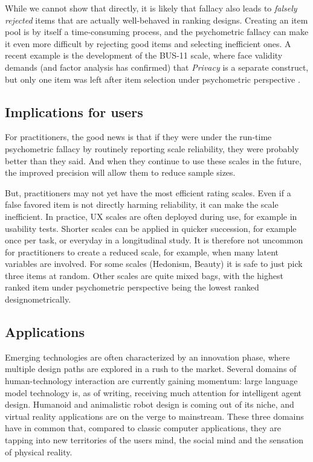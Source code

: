 \documentclass[
  authoryear,
  review]{elsarticle}
\begin{document}
While we cannot show that directly, it is likely that fallacy also leads
to \emph{falsely rejected} items that are actually well-behaved in
ranking designs. Creating an item pool is by itself a time-consuming
process, and the psychometric fallacy can make it even more difficult by
rejecting good items and selecting inefficient ones. A recent example is
the development of the BUS-11 scale, where face validity demands (and
factor analysis has confirmed) that \emph{Privacy} is a separate
construct, but only one item was left after item selection under
psychometric perspective \citep{Borsci2022}.

\subsection{Implications for users}\label{implications-for-users}

For practitioners, the good news is that if they were under the run-time
psychometric fallacy by routinely reporting scale reliability, they were
probably better than they said. And when they continue to use these
scales in the future, the improved precision will allow them to reduce
sample sizes.

But, practitioners may not yet have the most efficient rating scales.
Even if a false favored item is not directly harming reliability, it can
make the scale inefficient. In practice, UX scales are often deployed
during use, for example in usability tests. Shorter scales can be
applied in quicker succession, for example once per task, or everyday in
a longitudinal study. It is therefore not uncommon for practitioners to
create a reduced scale, for example, when many latent variables are
involved. For some scales (Hedonism, Beauty) it is safe to just pick
three items at random. Other scales are quite mixed bags, with the
highest ranked item under psychometric perspective being the lowest
ranked designometrically.

\subsection{Applications}\label{applications}

Emerging technologies are often characterized by an innovation phase,
where multiple design paths are explored in a rush to the market.
Several domains of human-technology interaction are currently gaining
momentum: large language model technology is, as of writing, receiving
much attention for intelligent agent design. Humanoid and animalistic
robot design is coming out of its niche, and virtual reality
applications are on the verge to mainstream. These three domains have in
common that, compared to classic computer applications, they are tapping
into new territories of the users mind, the social mind and the
sensation of physical reality.
\end{document}

